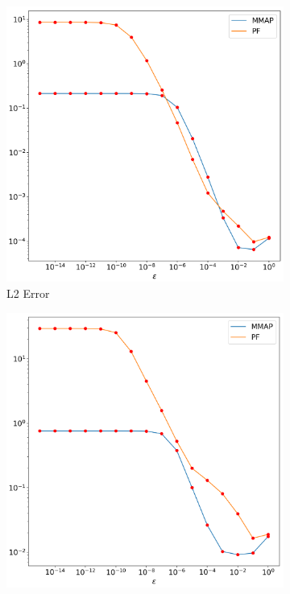 \documentclass[12pt]{ociamthesis}
\begin{document}
\begin{figure}[H]
 \begin{subfigure}{0.42\textwidth}
     \includegraphics[width=\textwidth]{Pics/LHSims/E2/E2_NormalL2.png}
     \caption{L2 Error} \label{E2_LH_L2}
 \end{subfigure}
   \begin{subfigure}{0.42\textwidth}
     \includegraphics[width=\textwidth]{Pics/LHSims/E2/E2_NormalH1.png}

\end{subfigure}
\end{figure}
\end{document}
